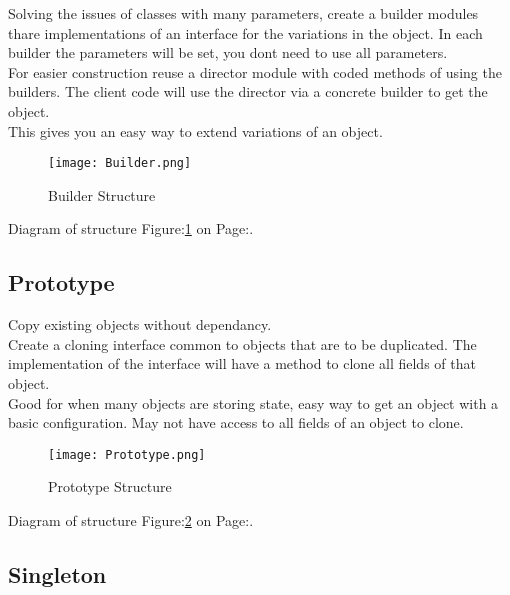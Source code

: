\documentclass[11pt]{scrartcl} %
\begin{document}
Solving the issues of classes with many parameters, create a builder modules thare implementations of
an interface for the variations in the object. In each builder the parameters will be set,
 you dont need to use all parameters.\\

For easier construction reuse a director module with coded methods of using the builders. The 
client code will use the director via a concrete builder to get the object.\\

This gives you an easy way to extend variations of an object.\\

\begin{figure}[h] %
	\centering
	\texttt{[image: Builder.png]} %
	\caption{Builder Structure}
	\label{Builder Structure}
\end{figure}

Diagram of structure Figure:\ref{Builder Structure} on Page:\pageref{Builder Structure}.

\subsection{Prototype}

Copy existing objects without dependancy.\\

Create a cloning interface common to objects that are to be duplicated. The implementation of the interface
will have a method to clone all fields of that object.\\

Good for when many objects are storing state, easy way to get an object with a basic configuration.
May not have access to all fields of an object to clone.\\

\begin{figure}[h] %
	\centering
	\texttt{[image: Prototype.png]} %
	\caption{Prototype Structure}
	\label{Prototype Structure}
\end{figure}

Diagram of structure Figure:\ref{Prototype Structure} on Page:\pageref{Prototype Structure}.

\subsection{Singleton}
\end{document}
